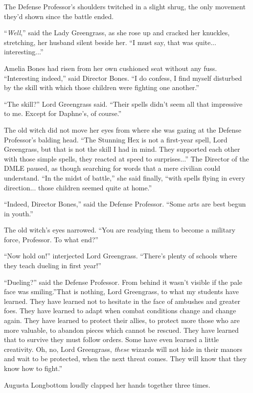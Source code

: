 The Defense Professor's shoulders twitched in a slight shrug, the only
movement they'd shown since the battle ended.

``\emph{Well},'' said the Lady Greengrass, as she rose up and cracked her
knuckles, stretching, her husband silent beside her. ``I must say, that
was quite... interesting...''

Amelia Bones had risen from her own cushioned seat without any fuss.
``Interesting indeed,'' said Director Bones. ``I do confess, I find
myself disturbed by the skill with which those children were fighting
one another.''

``The skill?'' Lord Greengrass said. ``Their spells didn't seem all that
impressive to me. Except for Daphne's, of course.''

The old witch did not move her eyes from where she was gazing at the
Defense Professor's balding head. ``The Stunning Hex is not a first-year
spell, Lord Greengrass, but that is not the skill I had in mind. They
supported each other with those simple spells, they reacted at speed to
surprises...'' The Director of the DMLE paused, as though searching
for words that a mere civilian could understand. ``In the midst of
battle,'' she said finally, ``with spells flying in every
direction... those children seemed quite at home.''

``Indeed, Director Bones,'' said the Defense Professor. ``Some arts are
best begun in youth.''

The old witch's eyes narrowed. ``You are readying them to become a
military force, Professor. To what end?''

``Now hold on!'' interjected Lord Greengrass. ``There's plenty of
schools where they teach dueling in first year!''

``Dueling?'' said the Defense Professor. From behind it wasn't visible
if the pale face was smiling.''That is nothing, Lord Greengrass, to what
my students have learned. They have learned not to hesitate in the face
of ambushes and greater foes. They have learned to adapt when combat
conditions change and change again. They have learned to protect their
allies, to protect more those who are more valuable, to abandon pieces
which cannot be rescued. They have learned that to survive they must
follow orders. Some have even learned a little creativity. Oh, no, Lord
Greengrass, \emph{these} wizards will not hide in their manors and wait
to be protected, when the next threat comes. They will know that they
know how to fight.''

Augusta Longbottom loudly clapped her hands together three times.

